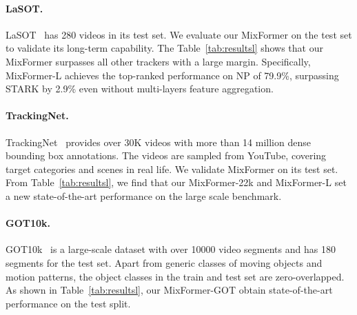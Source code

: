 \begin{table*}[ht]
{\begin{tabular}{c|ccc|ccc|ccc|cc}
    \bottomrule
    \end{tabular}}
    \vspace{-2mm}
    \caption{State-of-the-art comparison on TrackingNet~\cite{trackingnet}, LaSOT~\cite{lasot}, GOT-10k~\cite{got10k} and UAV123~\cite{uav123}. The best two results are shown in \textbf{\textcolor{red}{red}} and \textbf{\textcolor{blue}{blue}} fonts. The \underline{underline} results of GOT-10k are not considered in the comparison, since the models are trained with datasets other than GOT-10k. MixFormer-1k is the model pretrained with ImageNet-1k. Others are pretrained with ImageNet-22k. * denotes for trackers trained only with GOT-10k train split.}
    \vspace{-5mm}
    \label{tab:resultsl}
\end{table*}
\vspace{-4mm}
\paragraph{LaSOT.}
LaSOT~\cite{lasot} has 280 videos in its test set. We evaluate our MixFormer on the test set to validate its long-term capability. 
The Table~\ref{tab:resultsl} shows that our MixFormer surpasses all other trackers with a large margin. Specifically, MixFormer-L achieves the top-ranked performance on NP of 79.9\%, surpassing STARK by 2.9\% even without multi-layers feature aggregation. 
\vspace{-4mm}
\paragraph{TrackingNet.}
TrackingNet~\cite{trackingnet} provides over 30K videos with more than 14 million dense bounding box annotations. The videos are sampled from YouTube, covering target categories and scenes in real life. We validate MixFormer on its test set. From Table~\ref{tab:resultsl}, we find that our MixFormer-22k and MixFormer-L set a new state-of-the-art performance on the large scale benchmark.
\vspace{-4mm}
\paragraph{GOT10k.}
GOT10k~\cite{got10k} is a large-scale dataset with over 10000 video segments and has 180 segments for the test set. Apart from generic classes of moving objects and motion patterns, the object classes in the train and test set are zero-overlapped. As shown in Table~\ref{tab:resultsl}, our MixFormer-GOT obtain state-of-the-art performance on the test split.
